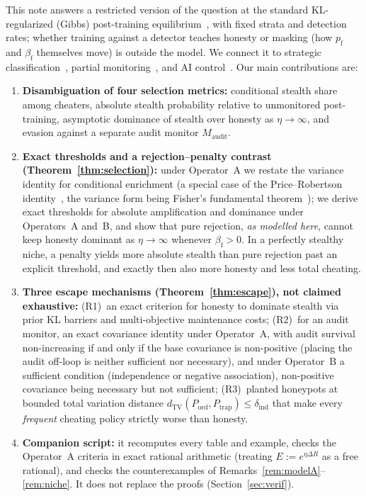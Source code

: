 \documentclass[11pt,a4paper]{article}
\newcommand{\dTV}{d_{\mathrm{TV}}}
\begin{document}
This note answers a restricted version of the question at the standard KL-regularized (Gibbs) post-training equilibrium~\cite{korbak2022}, with fixed strata and detection rates; whether training against a detector teaches honesty or masking (how $p_{\mathrm{f}}$ and $\beta_{\mathrm{f}}$ themselves move) is outside the model. We connect it to strategic classification~\cite{hardt2016}, partial monitoring~\cite{bartok2014}, and AI control~\cite{greenblatt2023,griffin2024,terekhov2025,ukaisi2025}. Our main contributions are:
\begin{enumerate}
  \item \textbf{Disambiguation of four selection metrics:} conditional stealth share among cheaters, absolute stealth probability relative to unmonitored post-training, asymptotic dominance of stealth over honesty as $\eta \to \infty$, and evasion against a separate audit monitor $M_{\mathrm{audit}}$.
  \item \textbf{Exact thresholds and a rejection--penalty contrast (Theorem~\ref{thm:selection}):} under Operator~A we restate the variance identity for conditional enrichment (a special case of the Price--Robertson identity~\cite{price1970,robertson1966}, the variance form being Fisher's fundamental theorem~\cite{fisher1930}); we derive exact thresholds for absolute amplification and dominance under Operators~A and~B, and show that pure rejection, \emph{as modelled here}, cannot keep honesty dominant as $\eta \to \infty$ whenever $\beta_{\mathrm{f}} > 0$. In a perfectly stealthy niche, a penalty yields more absolute stealth than pure rejection past an explicit threshold, and exactly then also more honesty and less total cheating.
  \item \textbf{Three escape mechanisms (Theorem~\ref{thm:escape}), not claimed exhaustive:} (R1)~an exact criterion for honesty to dominate stealth via prior KL barriers and multi-objective maintenance costs; (R2)~for an audit monitor, an exact covariance identity under Operator~A, with audit survival non-increasing if and only if the base covariance is non-positive (placing the audit off-loop is neither sufficient nor necessary), and under Operator~B a sufficient condition (independence or negative association), non-positive covariance being necessary but not sufficient; (R3)~planted honeypots at bounded total variation distance $\dTV(P_{\mathrm{ord}}, P_{\mathrm{trap}}) \le \delta_{\mathrm{ind}}$ that make every \emph{frequent} cheating policy strictly worse than honesty.
  \item \textbf{Companion script:} it recomputes every table and example, checks the Operator~A criteria in exact rational arithmetic (treating $E := e^{\eta\Delta R}$ as a free rational), and checks the counterexamples of Remarks~\ref{rem:modelA}--\ref{rem:niche}. It does not replace the proofs (Section~\ref{sec:verif}).
\end{enumerate}
\end{document}
